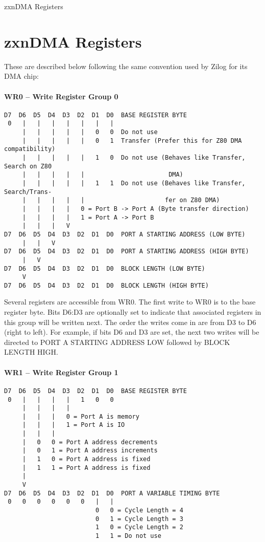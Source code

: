 \begin{multicols}{2}
\sinset
\begin{table}[h]\centering
  \caption{zxnDMA Registers}
\end{table}
\einset

\section{zxnDMA Registers}
\sinset
These are described below following the same convention used by Zilog
for its DMA chip:

\paragraph{WR0 – Write Register Group 0}
\begin{verbatim}
D7  D6  D5  D4  D3  D2  D1  D0  BASE REGISTER BYTE
 0   |   |   |   |   |   |   |
     |   |   |   |   |   0   0  Do not use
     |   |   |   |   |   0   1  Transfer (Prefer this for Z80 DMA compatibility)
     |   |   |   |   |   1   0  Do not use (Behaves like Transfer, Search on Z80
     |   |   |   |   |                       DMA)
     |   |   |   |   |   1   1  Do not use (Behaves like Transfer, Search/Trans-
     |   |   |   |   |                      fer on Z80 DMA)
     |   |   |   |   0 = Port B -> Port A (Byte transfer direction)
     |   |   |   |   1 = Port A -> Port B
     |   |   |   V
D7  D6  D5  D4  D3  D2  D1  D0  PORT A STARTING ADDRESS (LOW BYTE)
     |   |   V
D7  D6  D5  D4  D3  D2  D1  D0  PORT A STARTING ADDRESS (HIGH BYTE)
     |   V
D7  D6  D5  D4  D3  D2  D1  D0  BLOCK LENGTH (LOW BYTE)
     V
D7  D6  D5  D4  D3  D2  D1  D0  BLOCK LENGTH (HIGH BYTE)
\end{verbatim}

Several registers are accessible from WR0. The first write to WR0 is
to the base register byte. Bits D6:D3 are optionally set to indicate
that associated registers in this group will be written next. The
order the writes come in are from D3 to D6 (right to left). For
example, if bits D6 and D3 are set, the next two writes will be
directed to PORT A STARTING ADDRESS LOW followed by BLOCK LENGTH HIGH.

\paragraph{WR1 – Write Register Group 1}
\begin{verbatim}
D7  D6  D5  D4  D3  D2  D1  D0  BASE REGISTER BYTE
 0   |   |   |   |   1   0   0
     |   |   |   |
     |   |   |   0 = Port A is memory
     |   |   |   1 = Port A is IO
     |   |   |
     |   0   0 = Port A address decrements
     |   0   1 = Port A address increments
     |   1   0 = Port A address is fixed
     |   1   1 = Port A address is fixed
     |
     V
D7  D6  D5  D4  D3  D2  D1  D0  PORT A VARIABLE TIMING BYTE
 0   0   0   0   0   0   |   |
                         0   0 = Cycle Length = 4
                         0   1 = Cycle Length = 3
                         1   0 = Cycle Length = 2
                         1   1 = Do not use
\end{verbatim}


\end{multicols}
